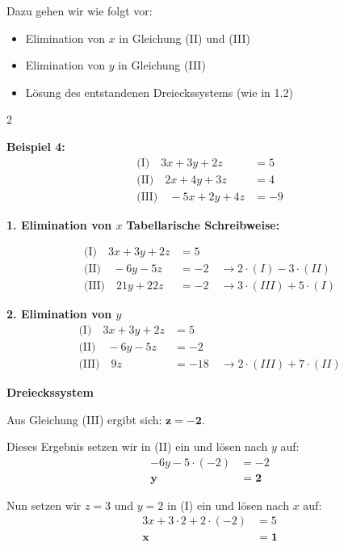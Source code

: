 \documentclass{article}
\begin{document}
Dazu gehen wir wie folgt vor:
\begin{itemize}
\item Elimination von $x$ in Gleichung (II) und (III)
\item Elimination von $y$ in Gleichung (III)
\item Lösung des entstandenen Dreieckssystems (wie in 1.2)
\end{itemize}

\hfill 2

\newpage

\textbf{Beispiel 4:}
\begin{align*}
\text{(I)} \quad 3x + 3y + 2z &= 5\\
\text{(II)} \quad 2x + 4y + 3z &= 4\\
\text{(III)} \quad -5x + 2y + 4z &= -9
\end{align*}

\textbf{1. Elimination von $x$} \hfill \textbf{Tabellarische Schreibweise:}

\begin{align*}
\text{(I)} \quad 3x + 3y + 2z &= 5\\
\text{(II)} \quad -6y - 5z &= -2 \quad \rightarrow 2 \cdot (I) - 3 \cdot (II)\\
\text{(III)} \quad 21y + 22z &= -2 \quad \rightarrow 3 \cdot (III) + 5 \cdot (I)
\end{align*}

\textbf{2. Elimination von $y$}
\begin{align*}
\text{(I)} \quad 3x + 3y + 2z &= 5\\
\text{(II)} \quad -6y - 5z &= -2\\
\text{(III)} \quad 9z &= -18 \quad \rightarrow 2 \cdot (III) + 7 \cdot (II)
\end{align*}

\textbf{Dreieckssystem}

Aus Gleichung (III) ergibt sich: $\mathbf{z = -2}$.

Dieses Ergebnis setzen wir in (II) ein und lösen nach $y$ auf:
\begin{align*}
-6y - 5 \cdot (-2) &= -2\\
\mathbf{y} &= \mathbf{2}
\end{align*}

Nun setzen wir $z = 3$ und $y = 2$ in (I) ein und lösen nach $x$ auf:
\begin{align*}
3x + 3 \cdot 2 + 2 \cdot (-2) &= 5\\
\mathbf{x} &= \mathbf{1}
\end{align*}
\end{document}

